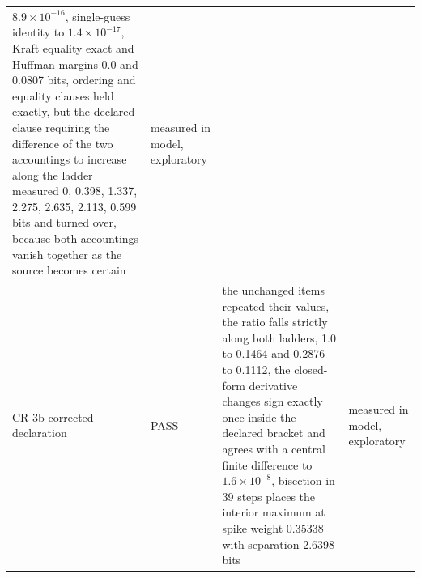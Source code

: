 \documentclass[aps,pre,reprint,nofootinbib]{revtex4-2}
\begin{document}
\begin{table}[t]
\begin{ruledtabular}
\begin{tabular}{L{2.6cm}lL{9.6cm}L{2.9cm}}
$8.9\times10^{-16}$, single-guess identity to $1.4\times10^{-17}$,
Kraft equality exact and Huffman margins
0.0 and 0.0807 bits, ordering and equality clauses held exactly, but
the declared clause requiring the difference of the two accountings to
increase along the ladder measured 0, 0.398, 1.337, 2.275, 2.635,
2.113, 0.599 bits and turned over, because both accountings vanish
together as the source becomes certain & measured in model,
exploratory \\
CR-3b corrected declaration & PASS & the unchanged items repeated
their values, the ratio falls strictly along both ladders, 1.0 to
0.1464 and 0.2876 to 0.1112, the closed-form derivative changes sign
exactly once inside the declared bracket and agrees with a central
finite difference to $1.6\times10^{-8}$, bisection in 39 steps
places the interior maximum at spike weight
0.35338 with separation 2.6398 bits &
measured in model, exploratory \\
\end{tabular}
\end{ruledtabular}
\end{table}
\end{document}
